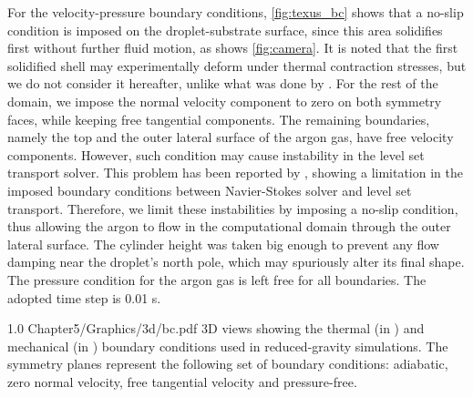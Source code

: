 For the velocity-pressure boundary conditions, \cref{fig:texus_bc} shows that a no-slip condition is imposed
on the droplet-substrate surface, 
since this area solidifies first without further fluid motion, as shows \cref{fig:camera}.
It is noted that the first solidified shell may experimentally deform under thermal contraction stresses, 
but we do not consider it hereafter, unlike what was done by \citet{rivaux_simulation_2011}. 
For the rest of the domain, we impose the normal velocity component to zero on both symmetry faces, 
while keeping free tangential components. The remaining boundaries, namely the top and the outer lateral surface of the argon gas,
have free velocity components. However, such condition may cause instability in the level set transport solver. 
This problem has been reported by \citep{basset_simulation_2006}, showing a limitation in the imposed boundary conditions between Navier-Stokes solver and level set transport. 
Therefore, we limit these instabilities by imposing a no-slip condition, thus allowing the argon to flow in the computational
domain through the outer lateral surface. 
The cylinder height was taken big enough to prevent any flow damping near the droplet's north pole,
which may spuriously alter its final shape. The pressure condition for the argon gas is left free for all boundaries.
The adopted time step is 0.01 s.



\begin{figureth}
{1.0}
{Chapter5/Graphics/3d/bc.pdf}
{3D views showing the thermal (in ) and mechanical (in ) boundary conditions used in reduced-gravity simulations.
The symmetry planes represent the following set of boundary conditions: adiabatic, zero normal velocity, free tangential velocity and pressure-free.}
\label{fig:texus_bc}
\end{figureth}

